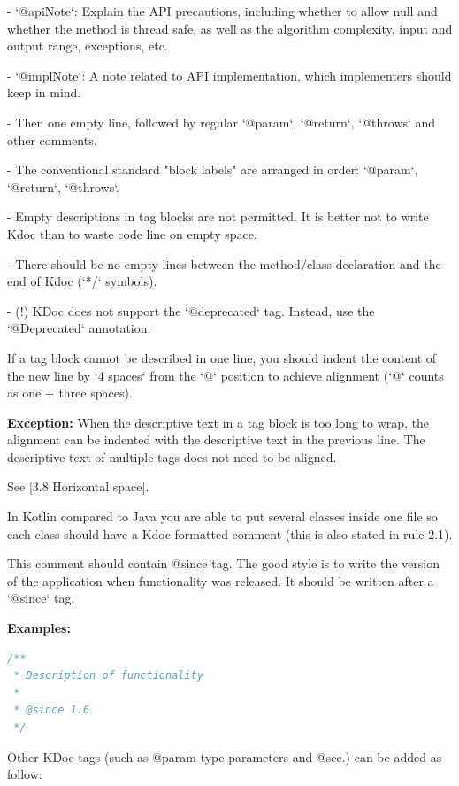 - `@apiNote`: Explain the API precautions, including whether to allow null and whether the method is thread safe, as well as the algorithm complexity, input and output range, exceptions, etc.

- `@implNote`: A note related to API implementation, which implementers should keep in mind.

- Then one empty line, followed by regular `@param`, `@return`, `@throws` and other comments.

- The conventional standard "block labels" are arranged in order: `@param`, `@return`, `@throws`.

- Empty descriptions in tag blocks are not permitted. It is better not to write Kdoc than to waste code line on empty space.

- There should be no empty lines between the method/class declaration and the end of Kdoc (`*/` symbols).

- (!) KDoc does not support the `@deprecated` tag. Instead, use the `@Deprecated` annotation.

 

If a tag block cannot be described in one line, you should indent the content of the new line by `4 spaces` from the `@` position to achieve alignment (`@` counts as one + three spaces).

 

\textbf{Exception:} When the descriptive text in a tag block is too long to wrap, the alignment can be indented with the descriptive text in the previous line. The descriptive text of multiple tags does not need to be aligned.

See [3.8 Horizontal space].



In Kotlin compared to Java you are able to put several classes inside one file so each class should have a Kdoc formatted comment (this is also stated in rule 2.1).

This comment should contain @since tag. The good style is to write the version of the application when functionality was released. It should be written after a `@since` tag.



\textbf{Examples:}



\begin{lstlisting}[language=Kotlin]
/**
 * Description of functionality
 *
 * @since 1.6
 */
\end{lstlisting}


Other KDoc tags (such as @param type parameters and @see.) can be added as follow:

